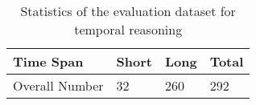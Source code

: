 \begin{table}[h!]
\centering
\caption{Statistics of the evaluation dataset for temporal reasoning}
\label{tab:etime_test}
\vskip 0.15in
\vspace{-2mm}
\setlength{\tabcolsep}{1.1mm}
\begin{tabular}{llll}
\toprule
\textbf{Time Span} & \textbf{Short}  & \textbf{Long} & \textbf{Total} \\
\hline
Overall Number & 32 & 260 & 292 \\
\bottomrule
\end{tabular}
\vspace{-2mm}
\end{table}